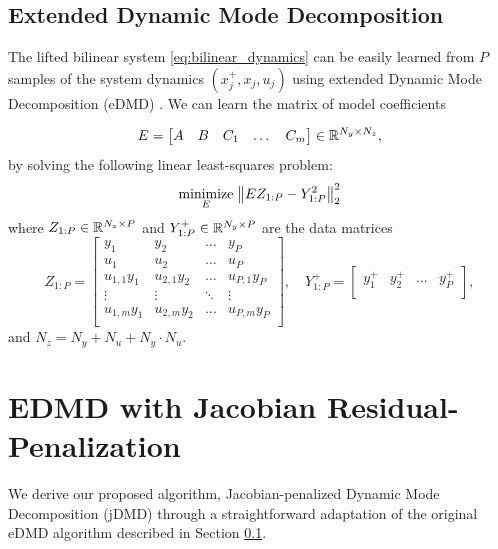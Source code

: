 \documentclass{article}
\begin{document}
\subsection{Extended Dynamic Mode Decomposition} \label{sec:edmd}

The lifted bilinear system \eqref{eq:bilinear_dynamics} can be easily learned
from $P$ samples of the system dynamics $(x_j^+,x_j,u_j)$ using extended Dynamic
Mode Decomposition (eDMD) \cite{Williams2015,Folkestad2021}. We can learn the
matrix of model coefficients

\begin{equation} \label{eq:E_matrixdef}
  E = \begin{bmatrix} A & B & C_1 & \dots & C_m \end{bmatrix} \in \mathbb{R}^{N_y \times N_z},
\end{equation}
by solving the following linear least-squares problem:
\begin{align} \label{opt:edmd}
  \underset{E}{\text{minimize}} \; \norm{E Z_{1:P} - Y_{1:P}^2}_2^2
\end{align}
where $Z_{1:P} \in \mathbb{R}^{N_z \times P}$ and $Y_{1:P}^+ \in \mathbb{R}^{N_y \times P}$ are the data 
matrices 
\begin{equation}
  Z_{1:P} = \begin{bmatrix}
    y_1         & y_2         & \dots  & y_P          \\
    u_1         & u_2         & \dots  & u_P          \\
    u_{1,1} y_1 & u_{2,1} y_2 & \dots  & u_{P,1} y_P  \\
    \vdots      & \vdots      & \ddots & \vdots       \\
    u_{1,m} y_1 & u_{2,m} y_2 & \dots  & u_{P,m} y_P  \\
  \end{bmatrix}, \quad 
  Y_{1:P}^+ = \begin{bmatrix}
    y_1^+         & y_2^+         & \dots  & y_P^+    \\
  \end{bmatrix},
\end{equation}
and $N_z = N_y + N_u + N_y \cdot N_u$.


\section{EDMD with Jacobian Residual-Penalization} \label{sec:jdmd}
We derive our proposed algorithm, Jacobian-penalized Dynamic Mode Decomposition (jDMD) 
through a straightforward adaptation of the original eDMD algorithm described in Section 
\ref{sec:edmd}.
\end{document}
